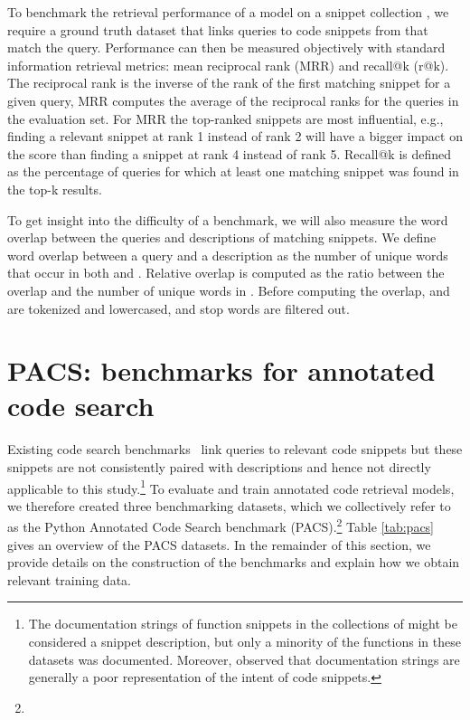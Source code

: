\documentclass[12pt,conference, onecolumn]{IEEEtran}
\begin{document}
To benchmark the retrieval performance of a model on a snippet collection , we require a ground truth dataset that links queries to code snippets from  that match the query.  Performance can then be measured objectively with standard information retrieval metrics: mean reciprocal rank (MRR) and recall@k (r@k). The reciprocal rank is the inverse of the rank of the first matching snippet for a given query, MRR computes the average of the reciprocal ranks for the queries in the evaluation set. For MRR the top-ranked snippets are most influential, e.g., finding a relevant snippet at rank 1 instead of rank 2 will have a bigger impact on the score than finding a snippet at rank 4 instead of rank 5. Recall@k is defined as the percentage of queries for which at least one matching snippet was found in the top-k results.

To get insight into the difficulty of a benchmark, we will also measure the word overlap between the queries and descriptions of matching snippets. We define word overlap between a query  and a description  as the number of unique words that occur in both  and . Relative overlap is computed as the ratio between the overlap and the number of unique words in . Before computing the overlap,  and  are tokenized and lowercased, and stop words are filtered out.






 
\section{PACS: benchmarks for annotated code search}\label{sec:benchmark}
Existing code search benchmarks~\cite{gu2018deep, sachdev2018retrieval, cambronero2019deep, husain2019codesearchnet, yao2019coacor} link queries to relevant code snippets but these snippets are not consistently paired with descriptions and hence not directly applicable to this study.\footnote{The documentation strings of function snippets in the collections of \citet{gu2018deep,sachdev2018retrieval,cambronero2019deep,husain2019codesearchnet} might be considered a snippet description, but only a minority of the functions in these datasets was documented. Moreover,  \citet{cambronero2019deep} observed that documentation strings are generally a poor representation of the intent of code snippets.} To evaluate and train annotated code retrieval models, we therefore created three benchmarking datasets, which we collectively refer to as the Python Annotated Code Search benchmark (PACS).\footnote{\repourl}  Table \ref{tab:pacs} gives an overview of the PACS datasets. In the remainder of this section, we provide details on the construction of the benchmarks and explain how we obtain relevant training data.
\end{document}
